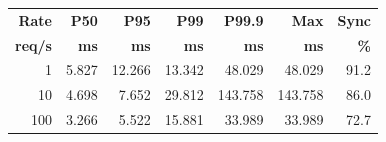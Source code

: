 \begin{tabular}{@{}rrrrrrr@{}}
\toprule
\textbf{Rate} & \textbf{P50} & \textbf{P95} & \textbf{P99} & \textbf{P99.9} & \textbf{Max} & \textbf{Sync} \\
\textbf{req/s} & \textbf{ms} & \textbf{ms} & \textbf{ms} & \textbf{ms} & \textbf{ms} & \textbf{\%} \\
\midrule
1 & 5.827 & 12.266 & 13.342 & 48.029 & 48.029 & 91.2 \\
10 & 4.698 & 7.652 & 29.812 & 143.758 & 143.758 & 86.0 \\
100 & 3.266 & 5.522 & 15.881 & 33.989 & 33.989 & 72.7 \\
\bottomrule
\end{tabular}
